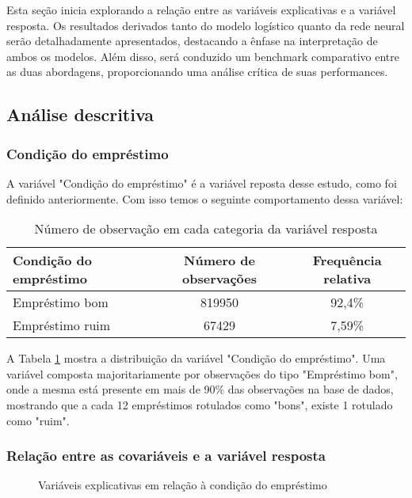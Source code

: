 Esta seção inicia explorando a relação entre as variáveis explicativas e a variável resposta. 
Os resultados derivados tanto do modelo logístico quanto da rede neural serão detalhadamente apresentados, 
destacando a ênfase na interpretação de ambos os modelos. Além disso, será conduzido um benchmark comparativo
 entre as duas abordagens, proporcionando uma análise crítica de suas performances.

 \subsection{Análise descritiva}

\subsubsection{Condição do empréstimo}

A variável "Condição do empréstimo" é a variável reposta desse estudo, como foi definido anteriormente.
Com isso temos o seguinte comportamento dessa variável:

\begin{table}[H]
  \centering
  \begin{tabular}{lcc}
    \hline
    \textbf{Condição do empréstimo} & \textbf{Número de observações} & \textbf{Frequência relativa} \\ \hline
    Empréstimo bom  & 819950 & 92,4\% \\
    Empréstimo ruim & 67429  & 7,59\% \\ \hline
  \end{tabular}
  \caption{Número de observação em cada categoria da variável resposta}
  \label{tab:freq_var_res}
\end{table}

A Tabela \ref{tab:freq_var_res} mostra a distribuição da variável "Condição do empréstimo". Uma variável composta majoritariamente 
por observações do tipo "Empréstimo bom", onde a mesma está presente em mais de 90\% das observações na base de dados, mostrando
que a cada 12 empréstimos rotulados como "bons", existe 1 rotulado como "ruim". 

\subsubsection{Relação entre as covariáveis e a variável resposta}

\begin{figure}[H]
  \centering
  \vspace{.5cm}
  \vspace{.5cm}
  
  \label{fig:exp_boxplot1}
  \caption{Variáveis explicativas em relação à condição do empréstimo}
  
\end{figure}

